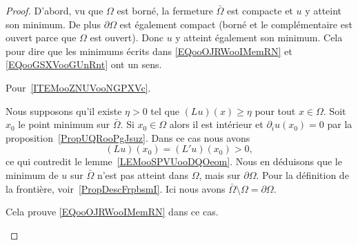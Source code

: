 \begin{proof}
    D'abord, vu que \( \Omega\) est borné, la fermeture \( \bar \Omega\) est compacte et \( u\) y atteint son minimum. De plus \( \partial \Omega\) est également compact (borné et le complémentaire est ouvert parce que \( \Omega\) est ouvert). Donc \( u\) y atteint également son minimum. Cela pour dire que les minimums écrits dans \eqref{EQooOJRWooIMemRN} et \eqref{EQooGSXVooGUnRnt} ont un sens.

    Pour~\ref{ITEMooZNUVooNGPXVc}.

    \begin{subproof}
        \item[\( Lu\geq \eta>0\)]

            Nous supposons qu'il existe \( \eta>0\) tel que \( (Lu)(x)\geq \eta \) pour tout \( x\in \Omega\). Soit \( x_0\) le point minimum sur \(\bar \Omega\). Si \( x_0\in \Omega\) alors il est intérieur et \( \partial_iu(x_0)=0\) par la proposition~\ref{PropUQRooPgJsuz}. Dans ce cas nous avons
            \begin{equation}
                (Lu)(x_0)=(L'u)(x_0)> 0,
            \end{equation}
            ce qui contredit le lemme~\ref{LEMooSPVUooDQOeom}. Nous en déduisons que le minimum de \( u\) sur \( \bar \Omega\) n'est pas atteint dans \( \Omega\), mais sur \( \partial\Omega\). Pour la définition de la frontière, voir~\ref{PropDescFrpbsmI}. Ici nous avons \( \bar\Omega\setminus\Omega=\partial\Omega\).

            Cela prouve \eqref{EQooOJRWooIMemRN} dans ce cas.

        \item[\( Lu\geq 0\) sur \( \Omega\)]


\end{subproof}
\end{proof}
